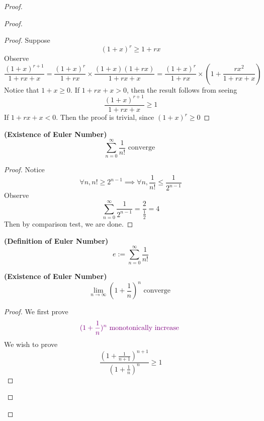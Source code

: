 \documentclass{report}
\begin{document}
\begin{proof}
\begin{proof}
\begin{proof}
Suppose 
\begin{equation*}
  (1+x)^r\geq 1+rx
\end{equation*} 
Observe
\begin{equation*}
  \frac{(1+x)^{r+1}}{1+rx+x}=\frac{(1+x)^r}{1+rx}\times \frac{(1+x)(1+rx)}{1+rx+x}=\frac{(1+x)^r}{1+rx}\times (1+\frac{rx^2}{1+rx+x})
\end{equation*}
Notice that $1+x\geq 0$. If $1+rx+x>0$, then the result follows from seeing 
\begin{equation*}
\frac{(1+x)^{r+1}}{1+rx+x}\geq 1
\end{equation*}
If $1+rx+x<0$. Then the proof is trivial, since $(1+x)^r\geq 0$ 
\end{proof}
\begin{theorem}
\label{4.5.2}
\textbf{(Existence of Euler Number)} 
\begin{equation}
\sum_{n=0}^\infty \frac{1}{n!}\text{ converge }
\end{equation}
\end{theorem}
\begin{proof}
Notice 
\begin{equation}
\forall n, n!\geq 2^{n-1}\implies \forall n,\frac{1}{n!}\leq \frac{1}{2^{n-1}}
\end{equation}
Observe 
\begin{equation}
\sum_{n=0}^\infty  \frac{1}{2^{n-1}}=\frac{2}{\frac{1}{2}}=4
\end{equation}
Then by comparison test, we are done. 
\end{proof}
\begin{definition}
\label{4.5.3}
\textbf{(Definition of Euler Number)}
\begin{equation}
e:=\sum_{n=0}^\infty \frac{1}{n!}
\end{equation}
\end{definition}
\begin{theorem}
\label{4.5.4}
\textbf{(Existence of Euler Number)}
\begin{equation}
\lim_{n\to\infty} (1+\frac{1}{n})^n\text{ converge }
\end{equation}
\end{theorem}
\begin{proof}
We first prove
\begin{equation}
\textcolor{violet}{(1+\frac{1}{n})^n\text{ monotonically increase }}
\end{equation}
We wish to prove
\begin{equation}
\frac{(1+\frac{1}{n+1})^{n+1}}{(1+\frac{1}{n})^n}\geq 1
\end{equation}

\end{proof}
\end{proof}
\end{proof}
\end{document}
